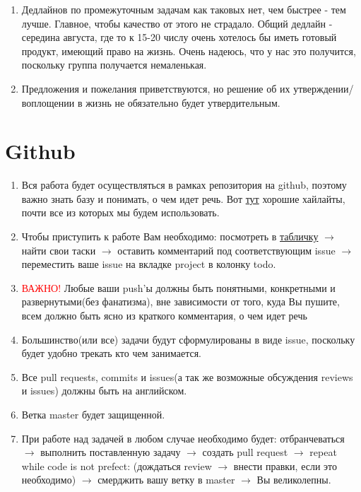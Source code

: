 \documentclass{article}
\begin{document}
\begin{enumerate}
    \item Дедлайнов по промежуточным задачам как таковых нет, чем быстрее - тем лучше. Главное, чтобы качество от этого не страдало. Общий дедлайн - середина августа, где то к 15-20 числу очень хотелось бы иметь готовый продукт, имеющий право на жизнь. Очень надеюсь, что у нас это получится, поскольку группа получается немаленькая.
    
    \item Предложения и пожелания приветствуются, но решение об их утверждении/воплощении в жизнь не обязательно будет утвердительным. 
\end{enumerate}

\section{Github}
\begin{enumerate}
    \item Вся работа будет осуществляться в рамках репозитория на github, поэтому важно знать базу и понимать, о чем идет речь. Вот \href{https://github.com/features/code-review/}{тут} хорошие хайлайты, почти все из которых мы будем использовать.
    \item Чтобы приступить к работе Вам необходимо: посмотреть в \href{https://github.com/Bazalii/School_Live_Simulator/blob/master/Pictures/Task_distribution.JPG}{табличку} $\rightarrow$ найти свои таски $\rightarrow$ оставить комментарий под соответствующим issue $\rightarrow$ переместить ваше issue на вкладке project в колонку todo. 
    \item \textcolor{red}{ВАЖНО!} Любые ваши push'ы должны быть понятными, конкретными и развернутыми(без фанатизма), вне зависимости от того, куда Вы пушите, всем должно быть ясно из краткого комментария, о чем идет речь
    \item Большинство(или все) задачи будут сформулированы в виде issue, поскольку будет удобно трекать кто чем занимается.
    \item Все pull requests, commits и issues(а так же возможные обсуждения reviews и issues) должны быть на английском.
    \item Ветка master будет защищенной.
    \item При работе над задачей в любом случае необходимо будет: отбранчеваться $\rightarrow$ выполнить поставленную задачу $\rightarrow$ создать pull request $\rightarrow$ repeat while code is not prefect: (дождаться review $\rightarrow$ внести правки, если это необходимо) $\rightarrow$ смерджить вашу ветку в master $\rightarrow$ Вы великолепны.
     
\end{enumerate}
\end{document}
